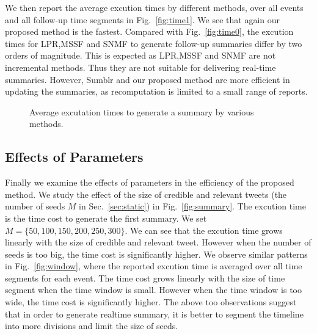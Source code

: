 \documentclass[envcountsame]{llncs}
\begin{document}
 We then report the average excution times by different methods, over all events and all follow-up time segments in Fig.~\ref{fig:time1}. We see that again our proposed method is the fastest. Compared with Fig.~\ref{fig:time0}, the excution times for LPR,MSSF and SNMF to generate follow-up summaries differ by two orders of magnitude. This is expected as LPR,MSSF and SNMF are not incremental methods. Thus they are not suitable for delivering real-time summaries. However, Sumblr and our proposed method are more efficient in updating the summaries, as recomputation is limited to a small range of reports.   
\begin{figure}
  \centering
{}
\hspace{-6ex}
\caption{Average excutation times to generate a summary by various methods. }
\end{figure}

\subsection{Effects of Parameters}

Finally we examine the effects of parameters in the efficiency of the proposed method. We study the effect of the size of credible and relevant tweets (the number of seeds $M$ in Sec.~\ref{sec:static}) in Fig.~\ref{fig:summary}. The excution time is the time cost to generate the first summary. We set $M=\{50,100,150,200,250,300\}$. We can see that the excution time grows linearly with the size of credible and relevant tweet. However when the number of seeds is too big, the time cost is significantly higher. We observe similar patterns in Fig.~\ref{fig:window}, where the reported excution time is averaged  over all time segments for each event. The time cost grows linearly with the size of time segment when the time window is small. However when the time window is too wide, the time cost is significantly higher. The above too observations suggest that in order to generate realtime summary, it is better to segment the timeline into more divisions and limit the size of seeds.
\end{document}
